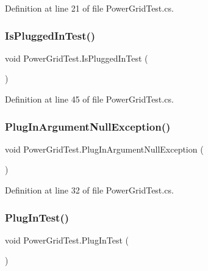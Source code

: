 Definition at line 21 of file Power\+Grid\+Test.\+cs.

\mbox{\label{class_power_grid_test_a6304851f56f271f4d748585011ec5a45}} 
\subsubsection{\texorpdfstring{Is\+Plugged\+In\+Test()}{IsPluggedInTest()}}
{\footnotesize\ttfamily void Power\+Grid\+Test.\+Is\+Plugged\+In\+Test (\begin{DoxyParamCaption}{ }\end{DoxyParamCaption})}



Definition at line 45 of file Power\+Grid\+Test.\+cs.

\mbox{\label{class_power_grid_test_a09404bb9a4818d4acf205ac445faf3b5}} 
\subsubsection{\texorpdfstring{Plug\+In\+Argument\+Null\+Exception()}{PlugInArgumentNullException()}}
{\footnotesize\ttfamily void Power\+Grid\+Test.\+Plug\+In\+Argument\+Null\+Exception (\begin{DoxyParamCaption}{ }\end{DoxyParamCaption})}



Definition at line 32 of file Power\+Grid\+Test.\+cs.

\mbox{\label{class_power_grid_test_aaa22ab030a08698ff9f72855372abf1e}} 
\subsubsection{\texorpdfstring{Plug\+In\+Test()}{PlugInTest()}}
{\footnotesize\ttfamily void Power\+Grid\+Test.\+Plug\+In\+Test (\begin{DoxyParamCaption}{ }\end{DoxyParamCaption})}



